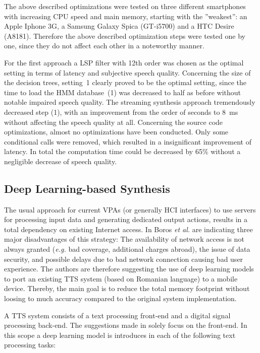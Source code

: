 The above described optimizations were tested on three different smartphones with increasing CPU speed and main memory, starting with the ''weakest'': an Apple Iphone 3G, a Samsung Galaxy Spica (GT-i5700) and a HTC Desire (A8181). Therefore the above described optimization steps were tested one by one, since they do not affect each other in a noteworthy manner.

For the first approach a \ac{LSP} filter with 12th order was chosen as the optimal setting in terms of latency and subjective speech quality. Concerning the size of the decision trees, setting~1 clearly proved to be the optimal setting, since the time to load the \ac{HMM} database~(1) was decreased to half as before without notable impaired speech quality. The streaming synthesis approach tremendously decreased step (1), with an improvement from the order of seconds to 8~ms without affecting the speech quality at all. Concerning the source code optimizations, almost no optimizations have been conducted. Only some conditional calls were removed, which resulted in a insignificant improvement of latency. In total the computation time could be decreased by 65\% without a negligible decrease of speech quality.

\subsection{Deep Learning-based Synthesis}
\label{subsec:deepembedded}

The usual approach for current \acp{VPA} (or generally \ac{HCI} interfaces) to use servers for processing input data and generating dedicated output actions, results in a total dependency on existing Internet access. In \cite{boros:robust} Boros \textit{et al.} are indicating three major disadvantages of this strategy: The availability of network access is not always granted (\textit{e.g.} bad coverage, additional charges abroad), the issue of data security, and possible delays due to bad network connection causing bad user experience. The authors are therefore suggesting the use of deep learning models to port an existing \ac{TTS} system (based on Romanian language) to a mobile device. Thereby, the main goal is to reduce the total memory footprint without loosing to much accuracy compared to the original system implementation.

A \ac{TTS} system consists of a text processing front-end and a digital signal processing back-end. The suggestions made in \cite{boros:robust} solely focus on the front-end. In this scope a deep learning model is introduces in each of the following text processing tasks:


